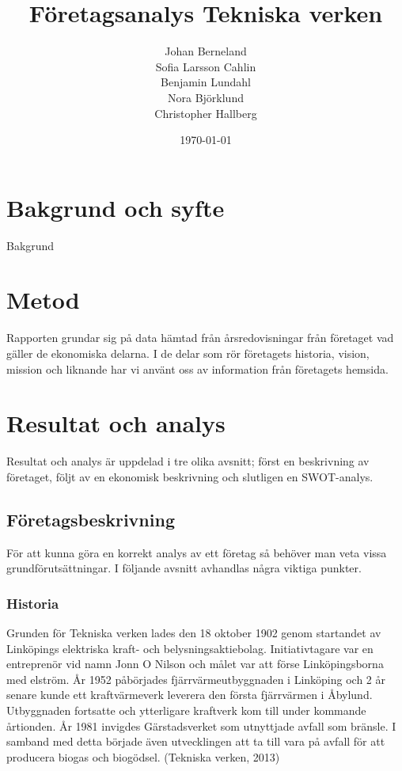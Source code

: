 \documentclass[10pt,a4paper]{article}
\title{Företagsanalys Tekniska verken}
\author{Johan Berneland\\Sofia Larsson Cahlin\\Benjamin Lundahl\\
    Nora Björklund\\Christopher Hallberg}
\date{\today}
\begin{document}
\maketitle

\newpage

\tableofcontents

\newpage

\section{Bakgrund och syfte}
Bakgrund

\section{Metod}
Rapporten grundar sig på data hämtad från årsredovisningar från företaget vad
gäller de ekonomiska delarna. I de delar som rör företagets historia, vision,
mission och liknande har vi använt oss av information från företagets hemsida.

\section{Resultat och analys}
Resultat och analys är uppdelad i tre olika avsnitt; först en beskrivning av
företaget, följt av en ekonomisk beskrivning och slutligen en SWOT-analys.

\subsection{Företagsbeskrivning}
För att kunna göra en korrekt analys av ett företag så behöver man veta vissa
grundförutsättningar. I följande avsnitt avhandlas några viktiga punkter. 

\subsubsection{Historia}
Grunden för Tekniska verken lades den 18 oktober 1902 genom startandet av
Linköpings elektriska kraft- och belysningsaktiebolag. Initiativtagare var en
entreprenör vid namn Jonn O Nilson och målet var att förse Linköpingsborna med
elström. År 1952 påbörjades fjärrvärmeutbyggnaden i Linköping och 2 år senare
kunde ett kraftvärmeverk leverera den första fjärrvärmen i Åbylund. Utbyggnaden
fortsatte och ytterligare kraftverk kom till under kommande årtionden. År 1981 
invigdes Gärstadsverket som utnyttjade avfall som bränsle. I samband med detta
började även utvecklingen att ta till vara på avfall för att producera biogas 
och biogödsel. (Tekniska verken, 2013) 
\end{document}
